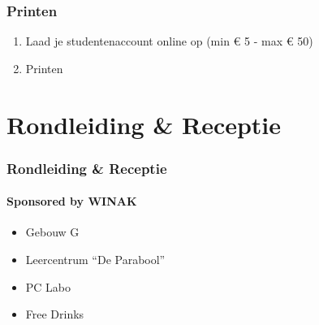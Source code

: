 \begin{frame}[allowframebreaks=10]
	\frametitle{Printen}
    
    \vspace{0.5cm}
    
    \begin{enumerate}
        \item Laad je studentenaccount online op (min € 5 - max € 50)
        \item Printen
    \end{enumerate}
\end{frame}

\section{Rondleiding \& Receptie}
\begin{frame}
	\frametitle{Rondleiding \& Receptie}
	\framesubtitle{Sponsored by WINAK}
    \begin{itemize}
       	\item Gebouw G
        \item Leercentrum ``De Parabool''
        \item PC Labo
        \item Free Drinks
	\end{itemize}
\end{frame}
